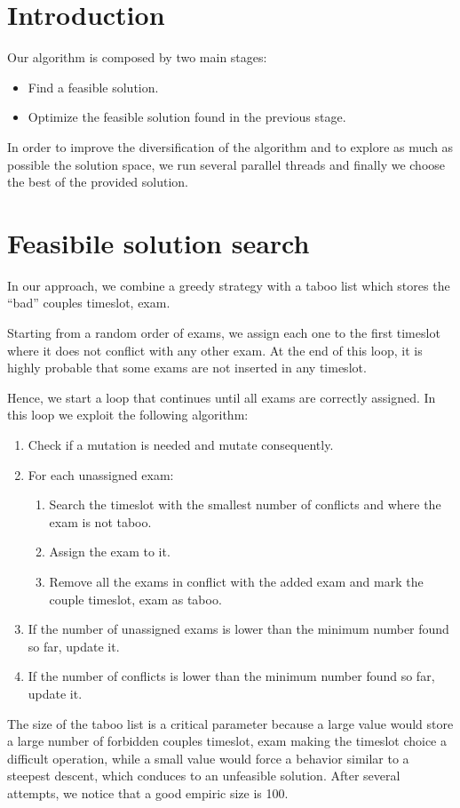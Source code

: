 \section*{Introduction}
Our algorithm is composed by two main stages:
\begin{itemize}
\item Find a feasible solution.
\item Optimize the feasible solution found in the previous stage.
\end{itemize}

In order to improve the diversification of the algorithm and to explore as much as possible the solution space, we run several parallel threads and finally we choose the best of the provided solution.

\section*{Feasibile solution search}
In our approach, we combine a greedy strategy with a taboo list which stores the ``bad'' couples timeslot, exam.

Starting from a random order of exams, we assign each one to the first timeslot where it does not conflict with any other exam. At the end of this loop, it is highly probable that some exams are not inserted in any timeslot.

Hence, we start a loop that continues until all exams are correctly assigned. In this loop we exploit the following algorithm:
\begin{enumerate}
\item Check if a mutation is needed and mutate consequently.
\item For each unassigned exam:
\begin{enumerate}
\item Search the timeslot with the smallest number of conflicts and where the exam is not taboo.
\item Assign the exam to it.
\item Remove all the exams in conflict with the added exam and mark the couple timeslot, exam as taboo.
\end{enumerate} 
\item If the number of unassigned exams is lower than the minimum number found so far, update it.
\item If the number of conflicts is lower than the minimum number found so far, update it.
\end{enumerate}
The size of the taboo list is a critical parameter because a large value would store a large number of forbidden couples timeslot, exam making the timeslot choice a difficult operation, while a small value would force a behavior similar to a steepest descent, which conduces to an unfeasible solution. After several attempts, we notice that a good empiric size is 100.

